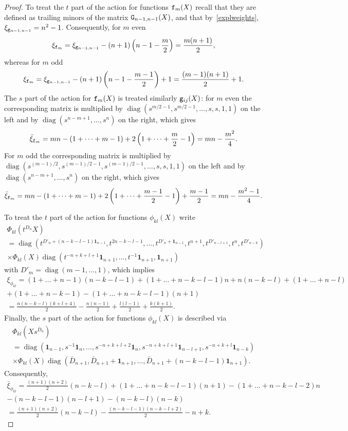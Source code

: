 \documentclass{amsart}
\theoremstyle{definition}
\theoremstyle{remark}
\numberwithin{equation}{section}
\numberwithin{theorem}{section}
\def\NG{{\tt G}}
\def\Nphi{{\mathsf\Phi}}
\def\ef{{\tt f}}
\def\eg{{\tt g}}
\def\one{\mathbf 1}
\def\diag{\operatorname{diag}}
\begin{document}
\begin{proof}
To treat the $t$ part of the action for functions $\ef_m(X)$ recall that they are defined as trailing minors of the
matrix $\NG_{n-1,n-1}(X)$, and that by~\eqref{explweights}, $\xi_{\eg_{n-1,n-1}}=n^2-1$. Consequently, for $m$ even
\[
\xi_{\ef_m}=\xi_{\eg_{n-1,n-1}}-(n+1)\left(n-1-\frac m2\right)=\frac{m(n+1)}2,
\]
whereas for $m$ odd
\[
\xi_{\ef_m}=\xi_{\eg_{n-1,n-1}}-(n+1)\left(n-1-\frac {m-1}2\right)+1=\frac{(m-1)(n+1)}2+1.
\]
The $s$ part of the action for $\ef_m(X)$ is treated similarly $\eg_{ij}(X)$: for $m$ even the corresponding matrix is multiplied by $\diag(s^{m/2-1},s^{m/2-1},\dots,s,s,1,1)$ on the left and by $\diag(s^{n-m+1},\dots,s^n)$ on the right, which gives
\[
\bar\xi_{\ef_m}=mn-(1+\dots+m-1)+2\left(1+\dots+\frac m2-1\right)=mn-\frac{m^2}4.
\]
For $m$ odd the corresponding matrix is multiplied by $\diag(s^{(m-1)/2},s^{(m-1)/2-1},\allowbreak s^{(m-1)/2-1},\dots,s,s,1,1)$ on the left and by $\diag(s^{n-m+1},\dots,s^n)$ on the right, which gives
\[
\bar\xi_{\ef_m}=mn-(1+\dots+m-1)+2\left(1+\dots+\frac {m-1}2-1\right)+\frac {m-1}2=mn-\frac{m^2-1}4.
\]

To treat the $t$ part of the action for functions $\phi_{kl}(X)$ write
\begin{multline*}
\Nphi_{kl}(t^{D_n}X)\\=\diag(t^{D'_n+(n-k-l-1)\one_{n-1}},t^{2n-k-l-1},\dots,t^{D'_n+\one_{n-1}},t^{n+1},t^{D'_{n-l+1}},
t^n,t^{D'_{n-k}})\\
\times\Nphi_{kl}(X)\diag(t^{-n+k+l+1}\one_{n+1},\dots,t^{-1}\one_{n+1},\one_{n+1})
\end{multline*} 
with $D'_m=\diag(m-1,\dots,1)$, which implies
\begin{multline*}
\xi_{\phi_{kl}}=(1+\dots+n-1)(n-k-l-1)+(1+\dots+n-k-l-1)n+n(n-k-l)+(1+\dots+n-l)\\
+(1+\dots+n-k-1)-(1+\dots+n-k-l-1)(n+1)\\
=\frac{n(n-k-l)(k+l+4)}2-\frac{n(n-1)}2+\frac{l(l-1)}2+\frac{k(k+1)}2.
\end{multline*}
Finally, the $s$ part of the action for functions $\phi_{kl}(X)$ is described via
\begin{multline*}
\Nphi_{kl}(Xs^{\bar D_n})\\=\diag(\one_{n-1},s^{-1}\one_n,\dots,s^{-n+k+l+2}\one_n,s^{-n+k+l+1}\one_{n-l+1},
s^{-n+k+l}\one_{n-k})\\
\times\Nphi_{kl}(X)\diag(\bar D_{n+1},\bar D_{n+1}+\one_{n+1},\dots, \bar D_{n+1}+(n-k-l-1)\one_{n+1}).
\end{multline*} 
Consequently,
\begin{multline*}
\bar\xi_{\phi_{kl}}=\frac{(n+1)(n+2)}2(n-k-l)+(1+\dots+n-k-l-1)(n+1)-(1+\dots+n-k-l-2)n\\
-(n-k-l-1)(n-l+1)-(n-k-l)(n-k)\\
=\frac{(n+1)(n+2)}2(n-k-l)-\frac{(n-k-l-1)(n-k-l+2)}2-n+k.
\end{multline*}
\end{proof} 
\end{document}
